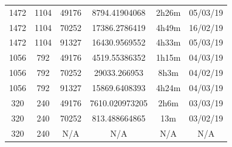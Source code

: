 \documentclass[11pt,a4paper]{report}
\begin{document}
\begin{itemize}
\begin{center}
\begin{tabular}{ c c c | c c c }
  1472 & 1104 & 49176 & 8794.41904068 & 2h26m & 05/03/19 \\
  1472 & 1104 & 70252 & 17386.2786419 & 4h49m & 16/02/19 \\
  1472 & 1104 & 91327 & 16430.9569552 & 4h33m & 05/03/19 \\
  1056 & 792 & 49176 & 4519.55386352 & 1h15m & 04/03/19 \\
  1056 & 792 & 70252 & 29033.266953 & 8h3m & 04/02/19 \\
  1056 & 792 & 91327 & 15869.6408393 & 4h24m & 04/03/19 \\
  320 & 240 & 49176 & 7610.020973205 & 2h6m & 03/03/19 \\
  320 & 240 & 70252 & 813.488664865 & 13m & 03/02/19 \\
  320 & 240 & N/A & N/A & N/A & N/A \\
  \end{tabular}
  \end{center}
  

\end{itemize}
\end{document}
